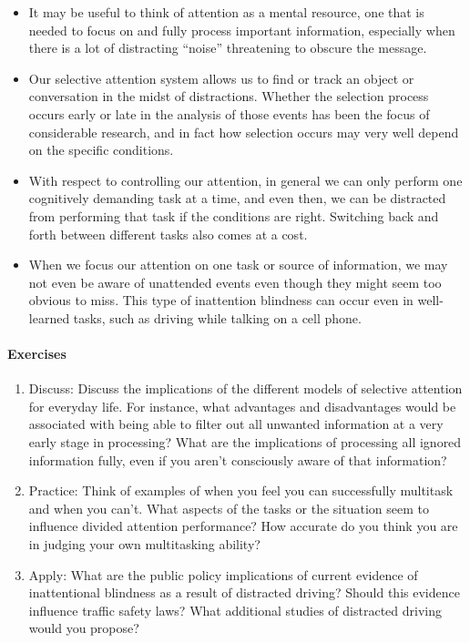 \documentclass[
]{krantz}
\providecommand{\tightlist}{%
  \setlength{\itemsep}{0pt}\setlength{\parskip}{0pt}}
\begin{document}
\begin{itemize}
\tightlist
\item
  It may be useful to think of attention as a mental resource, one that is needed to focus on and fully process important information, especially when there is a lot of distracting ``noise'' threatening to obscure the message.
\item
  Our selective attention system allows us to find or track an object or conversation in the midst of distractions. Whether the selection process occurs early or late in the analysis of those events has been the focus of considerable research, and in fact how selection occurs may very well depend on the specific conditions.
\item
  With respect to controlling our attention, in general we can only perform one cognitively demanding task at a time, and even then, we can be distracted from performing that task if the conditions are right. Switching back and forth between different tasks also comes at a cost.
\item
  When we focus our attention on one task or source of information, we may not even be aware of unattended events even though they might seem too obvious to miss. This type of inattention blindness can occur even in well-learned tasks, such as driving while talking on a cell phone.
\end{itemize}

\paragraph*{Exercises}\label{exercises-2}

\begin{enumerate}
\def\labelenumi{\arabic{enumi}.}
\tightlist
\item
  Discuss: Discuss the implications of the different models of selective attention for everyday life. For instance, what advantages and disadvantages would be associated with being able to filter out all unwanted information at a very early stage in processing? What are the implications of processing all ignored information fully, even if you aren't consciously aware of that information?
\item
  Practice: Think of examples of when you feel you can successfully multitask and when you can't. What aspects of the tasks or the situation seem to influence divided attention performance? How accurate do you think you are in judging your own multitasking ability?
\item
  Apply: What are the public policy implications of current evidence of inattentional blindness as a result of distracted driving? Should this evidence influence traffic safety laws? What additional studies of distracted driving would you propose?
\end{enumerate}
\end{document}
